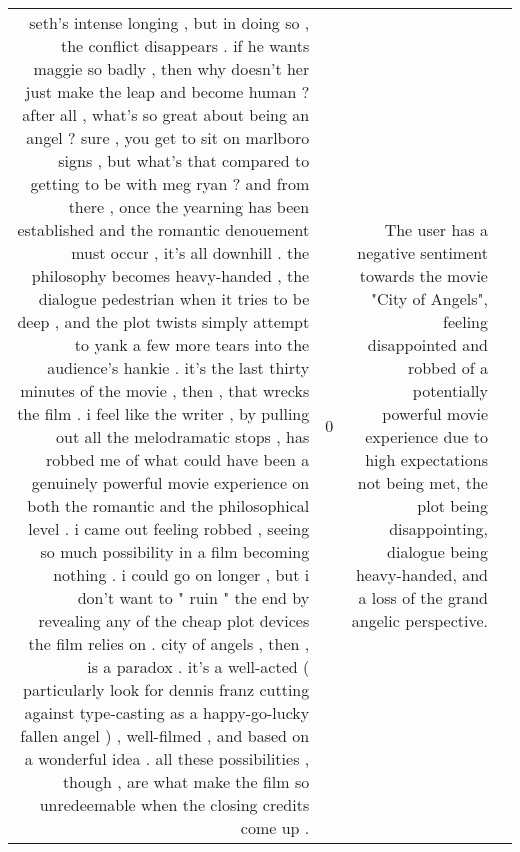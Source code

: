\begin{tabular}{r{1cm} p{0.4in} r{1cm} p{0.4in}}
seth's intense longing , but in doing so , the conflict disappears .  if he wants maggie so badly , then why doesn't her just make the leap and become human ?  after all , what's so great about being an angel ?  sure , you get to sit on marlboro signs , but what's that compared to getting to be with meg ryan ?  and from there , once the yearning has been established and the romantic denouement must occur , it's all downhill .  the philosophy becomes heavy-handed , the dialogue pedestrian when it tries to be deep , and the plot twists simply attempt to yank a few more tears into the audience's hankie .  it's the last thirty minutes of the movie , then , that wrecks the film .  i feel like the writer , by pulling out all the melodramatic stops , has robbed me of what could have been a genuinely powerful movie experience on both the romantic and the philosophical level .  i came out feeling robbed , seeing so much possibility in a film becoming nothing .  i could go on longer , but i don't want to " ruin " the end by revealing any of the cheap plot devices the film relies on .  city of angels , then , is a paradox .  it's a well-acted ( particularly look for dennis franz cutting against type-casting as a happy-go-lucky fallen angel ) , well-filmed , and based on a wonderful idea .  all these possibilities , though , are what make the film so unredeemable when the closing credits come up .   & 0 & The user has a negative sentiment towards the movie "City of Angels", feeling disappointed and robbed of a potentially powerful movie experience due to high expectations not being met, the plot being disappointing, dialogue being heavy-handed, and a loss of the grand angelic perspective. \\

\end{tabular}

